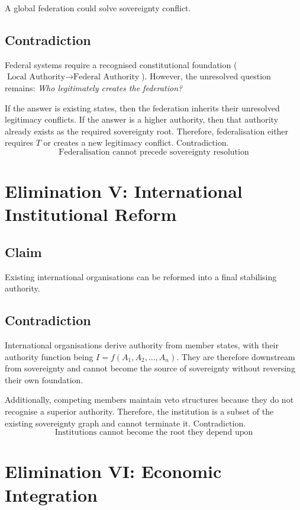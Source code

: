 \documentclass[11pt,openany]{book}
\theoremstyle{plain}
\theoremstyle{definition}
\begin{document}
A global federation could solve sovereignty conflict.

\subsection*{Contradiction}

Federal systems require a recognised constitutional foundation (\(\text{Local Authority} \to \text{Federal Authority}\)). However, the unresolved question remains: \textit{Who legitimately creates the federation?} 

If the answer is existing states, then the federation inherits their unresolved legitimacy conflicts. If the answer is a higher authority, then that authority already exists as the required sovereignty root. Therefore, federalisation either requires \(T\) or creates a new legitimacy conflict. Contradiction.
\[
\boxed{
\text{Federalisation cannot precede sovereignty resolution}
}
\]

\section*{Elimination V: International Institutional Reform}

\subsection*{Claim}

Existing international organisations can be reformed into a final stabilising authority.

\subsection*{Contradiction}

International organisations derive authority from member states, with their authority function being \(I = f(A_1, A_2, \ldots, A_n)\). They are therefore downstream from sovereignty and cannot become the source of sovereignty without reversing their own foundation. 

Additionally, competing members maintain veto structures because they do not recognise a superior authority. Therefore, the institution is a subset of the existing sovereignty graph and cannot terminate it. Contradiction.
\[
\boxed{
\text{Institutions cannot become the root they depend upon}
}
\]

\section*{Elimination VI: Economic Integration}
\end{document}
